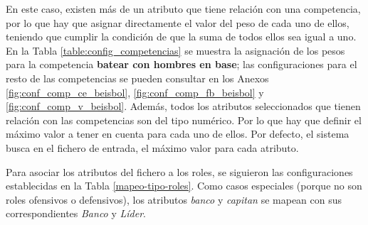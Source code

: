 En este caso, existen más de un atributo que tiene relación con una competencia, por lo que hay que asignar directamente el valor del peso de cada uno de ellos, teniendo que cumplir la condición de que la suma de todos ellos sea igual a uno. \\

En la Tabla \ref{table:config_competencias} se muestra la asignación de los pesos para la competencia \textbf{batear con hombres en base}; las configuraciones para el resto de las competencias se pueden consultar en los Anexos \ref{fig:conf_comp_ce_beisbol}, \ref{fig:conf_comp_fb_beisbol} y \ref{fig:conf_comp_v_beisbol}. Además, todos los atributos seleccionados que tienen relación con las competencias son del tipo numérico. Por lo que hay que definir el máximo valor a tener en cuenta para cada uno de ellos. Por defecto, el sistema busca en el fichero de entrada, el máximo valor para cada atributo.

\begin{table}[H]
	\centering
	\caption{Configuración de la competencia  \textbf{batear con hombres en base}}\label{table:config_competencias}
\end{table}

Para asociar los atributos del fichero a los roles, se siguieron las configuraciones establecidas en la Tabla \ref{mapeo-tipo-roles}. Como casos especiales (porque no son roles ofensivos o defensivos), los atributos \textit{banco} y \textit{capitan} se mapean con sus correspondientes \textit{Banco} y \textit{Líder}.

